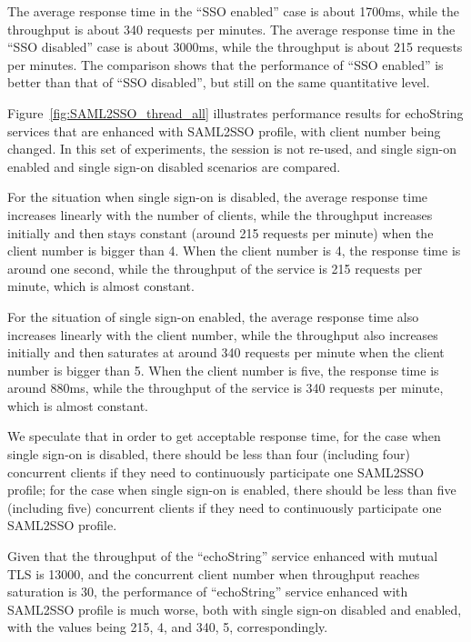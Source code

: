 \documentclass[conference]{IEEEtran}
\begin{document}
The average response time in the ``SSO enabled'' case is about 1700ms, while the throughput is about
340 requests per minutes. The average response time in the ``SSO disabled'' case is about 3000ms, while 
the throughput is about 215 requests per minutes. The comparison shows that the performance 
of ``SSO enabled'' is better than that of ``SSO disabled'', but still on the same quantitative
level.

Figure~\ref{fig:SAML2SSO_thread_all} illustrates performance results for
echoString services that are enhanced with SAML2SSO profile, with client number being changed. In
this set of experiments, the session is not re-used, and single sign-on enabled and single sign-on
disabled scenarios are compared. 

For the situation when single sign-on is disabled, the average response time 
increases linearly with the number of clients, while the throughput increases initially and then 
stays constant (around 215 requests per minute) when the client number is bigger 
than 4. When the client number is 4, the response time is around one second, while the 
throughput of the service is 215 requests per minute, which is almost constant.

For the situation of single sign-on enabled, the average response time 
also increases linearly with the client number, while the throughput also increases initially and then 
saturates at around 340 requests per minute when the client number is bigger 
than 5. When the client number is five, the response time is around 880ms, while the 
throughput of the service is 340 requests per minute, which is almost constant.

We speculate that in order to get acceptable response time, for the case when single sign-on is disabled, 
there should be less than four (including four) concurrent clients if they need to continuously 
participate one SAML2SSO profile; for the case when single sign-on is enabled, 
there should be less than five (including five) concurrent clients if they need to continuously 
participate one SAML2SSO profile.

Given that the throughput of the ``echoString'' service enhanced with mutual
TLS is 13000, and the concurrent client number when throughput reaches saturation is 30, the
performance of ``echoString'' service enhanced with SAML2SSO profile is much worse, both 
with single sign-on disabled and enabled, with the values being 215, 4, and 340, 5, correspondingly.
\end{document}
